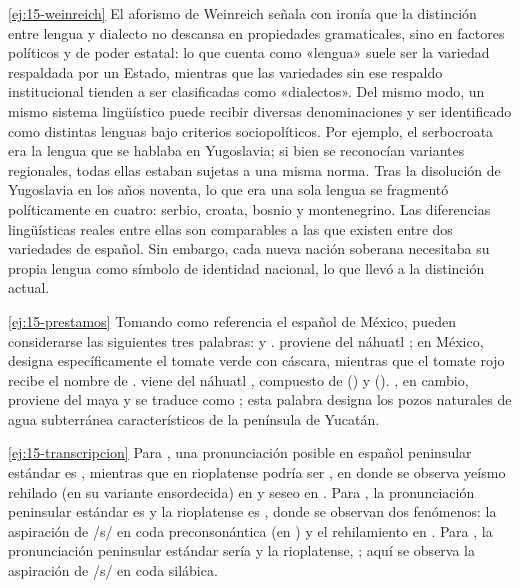\lecturasrecomendadas

\solucionario

\begin{solucion}{\ref{ej:15-weinreich}}
El aforismo de Weinreich señala con ironía que la distinción entre lengua y
dialecto no descansa en propiedades gramaticales, sino en factores políticos y de
poder estatal: lo que cuenta como «lengua» suele ser la variedad respaldada por
un Estado, mientras que las variedades sin ese respaldo institucional tienden a
ser clasificadas como «dialectos». Del mismo modo, un mismo sistema lingüístico
puede recibir diversas denominaciones y ser identificado como distintas lenguas
bajo criterios sociopolíticos. Por ejemplo, el serbocroata era la lengua que se
hablaba en Yugoslavia; si bien se reconocían variantes regionales, todas ellas
estaban sujetas a una misma norma. Tras la disolución de Yugoslavia en los años
noventa, lo que era una sola lengua se fragmentó políticamente en cuatro: serbio,
croata, bosnio y montenegrino. Las diferencias lingüísticas reales entre ellas
son comparables a las que existen entre dos variedades de español. Sin embargo,
cada nueva nación soberana necesitaba su propia lengua como símbolo de identidad
nacional, lo que llevó a la distinción actual.
\end{solucion}

\begin{solucion}{\ref{ej:15-prestamos}}
Tomando como referencia el español de México, pueden considerarse las siguientes
tres palabras:  y . 
proviene del náhuatl ; en México, designa específicamente el tomate
verde con cáscara, mientras que el tomate rojo recibe el nombre de
.  viene del náhuatl , compuesto
de  () y  (). , en
cambio, proviene del maya  y se traduce como ; esta palabra designa los pozos naturales de agua subterránea
característicos de la península de Yucatán.
\end{solucion}

\begin{solucion}{\ref{ej:15-transcripcion}}
Para , una pronunciación posible en español peninsular
estándar es , mientras que en rioplatense podría ser
, en donde se observa yeísmo rehilado (en su
variante ensordecida) en  y seseo en . Para , la pronunciación peninsular estándar es  y
la rioplatense es , donde se observan dos fenómenos: la
aspiración de /s/ en coda preconsonántica (en ) y el rehilamiento en
. Para , la pronunciación peninsular estándar
sería  y la rioplatense, ; aquí se
observa la aspiración de /s/ en coda silábica.
\end{solucion}

